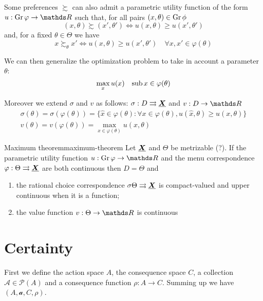 \documentclass[12pt]{extarticle}
\renewcommand{\vec}[1]{\uvec{#1}}
\newcommand{\Gr}{{\operatorfont Gr} \,}
\begin{document}
Some preferences $\succsim$ can also admit a parametric utility function of the form $u : \Gr \varphi \to \R$ such that, for all pairs $(x, \theta) \in \Gr \phi$
\begin{equation}
	(x, \theta) \succsim (x', \theta') \iff u(x, \theta) \geq u(x', \theta')
\end{equation}
and, for a fixed $\theta \in \Theta$ we have
\begin{equation}
	x \succsim_\theta x' \iff u(x,\theta) \geq u(x', \theta') \quad \forall x,x' \in \varphi(\theta)
\end{equation}

We can then generalize the optimization problem to take in account a parameter $\theta$:
\begin{equation}
	\max_x u(x) \quad {\operatorfont sub} \, x \in \varphi (\theta)
\end{equation}

Moreover we extend $\sigma$ and $v$ as follows:
$\sigma : D \rightrightarrows \vec X$ and $v: D \to \R$
\begin{gather}
	\sigma(\theta) = \sigma(\varphi(\theta)) = \{ \hat x \in \varphi(\theta) : \forall x \in \varphi(\theta), u(\hat x, \theta) \geq u(x, \theta)\} \\
	v(\theta) = v(\varphi(\theta)) = \max_{x \in \varphi (\theta)} u(x, \theta)
\end{gather}

\begin{theorem}{Maximum theorem}{maximum-theorem}
	Let $\vec X$ and $\Theta$ be metrizable (?).
	If the parametric utility function $u: \Gr \varphi \to \R$ and the menu correspondence $\varphi: \Theta \rightrightarrows \vec X$ are both continuous then $D = \Theta$ and
	\begin{enumerate}[label=\roman*.]
		\item the rational choice correspondence $\sigma \Theta \rightrightarrows \vec X$ is compact-valued and upper continuous when it is a function;
		\item the value function $v: \Theta \to \R$ is continuous
	\end{enumerate}
\end{theorem}

\section{Certainty}

First we define the action space $A$, the consequence space $C$, a collection $\mathcal A \in \mathcal P(A)$ and a consequence function $\rho: A \to C$.
Summing up we have $(A, \mathcal a, C, \rho)$.
\end{document}
